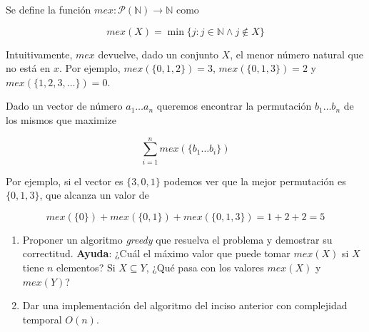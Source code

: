 
\item Se define la función $mex: \mathcal{P}(\mathbb{N}) \to \mathbb{N}$ como

$$
mex(X) = \min\{j : j\in \mathbb{N} \wedge j \notin X\}
$$

Intuitivamente, $mex$ devuelve, dado un conjunto $X$, el menor número natural que no está en $x$. Por ejemplo, $mex(\{0,1,2\}) = 3$, $mex(\{0, 1, 3\}) = 2$ y $mex(\{1,2,3, \ldots\}) = 0$.

Dado un vector de número $a_1 \ldots a_n$ queremos encontrar la permutación $b_1 \ldots b_n$ de los mismos que maximize

$$
\sum_{i=1}^n mex(\{b_1 \ldots b_i\})
$$

Por ejemplo, si el vector es $\{3, 0, 1\}$ podemos ver que la mejor permutación es $\{0, 1, 3\}$, que alcanza un valor de

$$
mex(\{0\}) + mex(\{0, 1\}) + mex(\{0,1,3\}) = 1+2+2 = 5
$$

\begin{enumerate}
    \item Proponer un algoritmo \textit{greedy} que resuelva el problema y demostrar su correctitud. \textbf{Ayuda}: ¿Cuál el máximo valor que puede tomar $mex(X)$ si $X$ tiene $n$ elementos? Si $X \subseteq Y$, ¿Qué pasa con los valores $mex(X)$ y $mex(Y)$?

    \item Dar una implementación del algoritmo del inciso anterior con complejidad temporal $O(n)$.
\end{enumerate}

